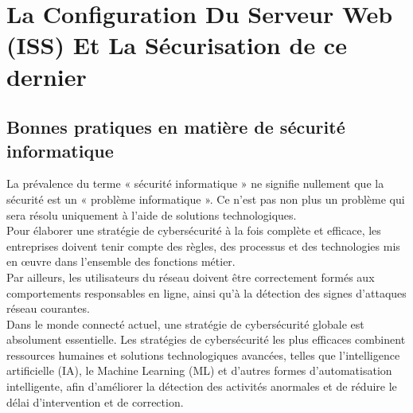 \chapter{La Configuration Du Serveur Web (ISS) Et La Sécurisation de ce dernier }


\section{Bonnes pratiques en matière de sécurité informatique}

La prévalence du terme « sécurité informatique » ne signifie nullement que la sécurité est un « problème informatique ». Ce n’est pas non plus un problème qui sera résolu uniquement à l’aide de solutions technologiques.\\ Pour élaborer une stratégie de cybersécurité à la fois complète et efficace, les entreprises doivent tenir compte des règles, des processus et des technologies mis en œuvre dans l’ensemble des fonctions métier.\\ Par ailleurs, les utilisateurs du réseau doivent être correctement formés aux comportements responsables en ligne, ainsi qu’à la détection des signes d’attaques réseau courantes.\\

Dans le monde connecté actuel, une stratégie de cybersécurité globale est absolument essentielle. Les stratégies de cybersécurité les plus efficaces combinent ressources humaines et solutions technologiques avancées, telles que l’intelligence artificielle (IA), le Machine Learning (ML) et d’autres formes d’automatisation intelligente, afin d’améliorer la détection des activités anormales et de réduire le délai d’intervention et de correction.\\

